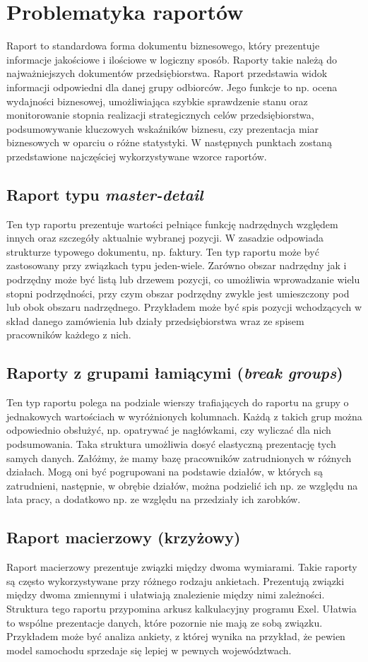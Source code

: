 \documentclass[11pt,a4paper]{article}
\begin{document}
\section{Problematyka raportów}\label{sec:raport}
Raport to standardowa forma dokumentu biznesowego, który prezentuje informacje jakościowe i ilościowe w logiczny sposób. Raporty takie należą do najważniejszych dokumentów przedsiębiorstwa. Raport przedstawia widok informacji odpowiedni dla danej grupy odbiorców. Jego funkcje to np.
ocena wydajności biznesowej, umożliwiająca szybkie sprawdzenie stanu oraz monitorowanie stopnia realizacji strategicznych celów przedsiębiorstwa, podsumowywanie kluczowych wskaźników biznesu, czy prezentacja miar biznesowych w oparciu o różne statystyki. W następnych punktach zostaną przedstawione najczęściej wykorzystywane wzorce raportów.
\subsection{Raport typu \emph{master-detail}}\label{sec:master_detail}
Ten typ raportu prezentuje wartości pełniące funkcję nadrzędnych względem innych oraz szczegóły aktualnie wybranej pozycji. W zasadzie odpowiada strukturze typowego dokumentu, np. faktury. Ten typ raportu może być zastosowany przy związkach typu jeden-wiele. Zarówno obszar nadrzędny jak i podrzędny może być listą lub drzewem pozycji, co umożliwia wprowadzanie wielu stopni podrzędności, przy czym obszar podrzędny zwykle jest umieszczony pod lub obok obszaru nadrzędnego. Przykładem może być spis pozycji wchodzących w skład danego zamówienia lub działy przedsiębiorstwa wraz ze spisem pracowników każdego z nich.
\subsection{Raporty z grupami łamiącymi (\emph{break groups})}\label{sec:break_groups}
Ten typ raportu polega na podziale wierszy trafiających do raportu na grupy o jednakowych wartościach w wyróżnionych kolumnach. Każdą z takich grup można odpowiednio obsłużyć, np. opatrywać je nagłówkami, czy wyliczać dla nich podsumowania. Taka struktura umożliwia dosyć elastyczną prezentację tych samych danych. Załóżmy, że mamy bazę pracowników zatrudnionych w różnych działach. Mogą oni być pogrupowani na podstawie działów, w których są zatrudnieni, następnie, w obrębie działów, można podzielić ich np. ze względu na lata pracy, a dodatkowo np. ze względu na przedziały ich zarobków. 
\subsection{Raport macierzowy (krzyżowy)}\label{sec:macierzowy}
Raport macierzowy prezentuje związki między dwoma wymiarami. Takie raporty są często wykorzystywane przy różnego rodzaju ankietach. Prezentują związki między dwoma zmiennymi i ułatwiają znalezienie między nimi zależności. Struktura tego raportu przypomina arkusz kalkulacyjny programu Exel. Ułatwia to wspólne prezentacje danych, które pozornie nie mają ze sobą związku. Przykładem może być analiza ankiety, z której wynika na przykład, że pewien model samochodu sprzedaje się lepiej w pewnych województwach.
\end{document}
